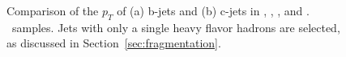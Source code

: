 \begin{figure}
\centering
\caption{Comparison of the $p_T$ of (a) b-jets and (b) c-jets in \PythiaE, \Pythia, \Herwigpp, and \Herwig.  \ttbar\ samples. Jets with only a single heavy flavor hadrons are selected, as discussed in Section~\ref{sec:fragmentation}.}
\label{fig:jetpt}
\end{figure}